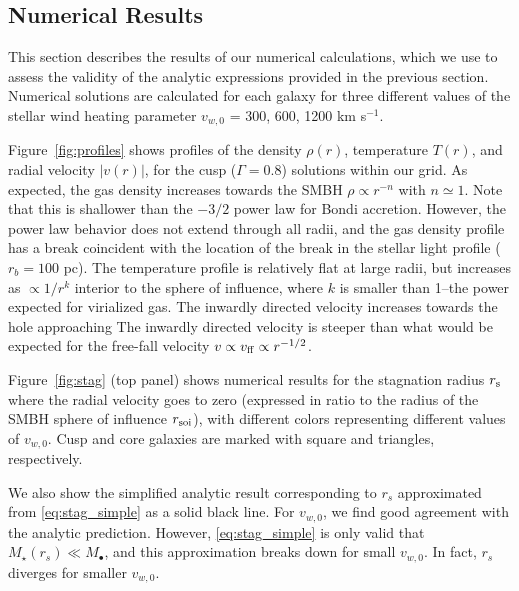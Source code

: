 \documentclass[usenatbib,fleqn]{mn2e}
\newcommand{\rs}{r_s}
\newcommand{\rb}{r_b}
\newcommand{\Mstar}{M_{\star}}
\newcommand{\Mbh}[1][]{M_{\bullet#1}}
\newcommand{\vwO}{v_{w,0}}
\begin{document}
%


\subsection{Numerical Results}
\label{sec:numerical}

This section describes the results of our numerical calculations, which we use to assess the validity of the analytic expressions provided in the previous section.  Numerical solutions are calculated for each galaxy for three different values of the stellar wind heating parameter $v_{w,0}$ = 300, 600, 1200 km s$^{-1}$.  

Figure~\ref{fig:profiles} shows profiles of the density $\rho(r)$,
temperature $T(r)$, and radial velocity $|v(r)|$, for the cusp
($\Gamma=0.8$) solutions within our grid.  As expected, the gas
density increases towards the SMBH $\rho\propto r^{-n}$ with
$n\simeq1$.  Note that this is shallower than the $-3/2$ power law for
Bondi accretion. However, the power law behavior does not extend
through all radii, and the gas density profile has a break coincident
with the location of the break in the stellar light profile ($\rb=100$
pc). The temperature profile is relatively flat at large radii, but
increases as $\propto 1/r^{k}$ interior to the sphere of influence,
where $k$ is smaller than 1--the power expected for virialized gas.
The inwardly directed velocity increases towards the hole approaching
The inwardly directed velocity is steeper than what would be expected
for the free-fall velocity $v \propto v_{\rm ff}\propto r^{-1/2}$.


Figure~\ref{fig:stag} (top panel) shows numerical results for the
stagnation radius $r_{\rm s}$ where the radial velocity goes to zero
(expressed in ratio to the radius of the SMBH sphere of influence
$r_{\rm soi}$), with different colors representing different values of
$v_{w,0}$.  Cusp and core galaxies are marked with square and
triangles, respectively.

We also show the simplified analytic result corresponding to $\rs$
approximated from \eqref{eq:stag_simple} as a solid black line. For
$\vwO$, we find good agreement with the analytic prediction. However,
\eqref{eq:stag_simple} is only valid that $\Mstar(\rs) \ll \Mbh$, and
this approximation breaks down for small $\vwO$. In fact, $\rs$
diverges for smaller $\vwO$. 
\end{document}
